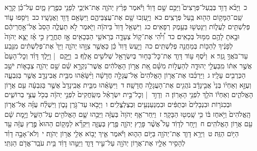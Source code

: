 \documentclass[18pt]{article}
\newcommand{\kri}[1]{\Afootnote{#1}}	%
\begin{document}
 {\loc כ~}וַיָּבֹ֨א דָוִ֥ד בְּבַֽעַל־פְּרָצִים֮ וַיַּכֵּ֣ם שָׁ֣ם דָּוִד֒ וַיֹּ֕אמֶר פָּרַ֨ץ יְהֹוָ֧ה אֶת־אֹיְבַ֛י לְפָנַ֖י כְּפֶ֣רֶץ מָ֑יִם עַל־כֵּ֗ן קָרָ֛א שֵֽׁם־הַמָּק֥וֹם הַה֖וּא בַּ֥עַל פְּרָצִֽים׃ \startlock
 {\loc כא~}וַיַּ֥עַזְבוּ שָׁ֖ם אֶת־עֲצַבֵּיהֶ֑ם וַיִּשָּׂאֵ֥ם דָּוִ֖ד וַאֲנָשָֽׁיו׃ \startlock
 {\loc כב~}וַיֹּסִ֥פוּ ע֛וֹד פְּלִשְׁתִּ֖ים לַעֲל֑וֹת וַיִּנָּטְשׁ֖וּ בְּעֵ֥מֶק רְפָאִֽים׃ \startlock
 {\loc כג~}וַיִּשְׁאַ֤ל דָּוִד֙ בַּיהֹוָ֔ה וַיֹּ֖אמֶר לֹ֣א תַעֲלֶ֑ה הָסֵב֙ אֶל־אַ֣חֲרֵיהֶ֔ם וּבָ֥אתָ לָהֶ֖ם מִמּ֥וּל בְּכָאִֽים׃ \startlock
 {\loc כד~}וִ֠יהִ֠י  \edtext{(בשמעך)}{\kri{קרי: כְּֽשׇׁמְעֲךָ֞}}  אֶת־ק֧וֹל צְעָדָ֛ה בְּרָאשֵׁ֥י הַבְּכָאִ֖ים אָ֣ז תֶּחֱרָ֑ץ כִּ֣י אָ֗ז יָצָ֤א יְהֹוָה֙ לְפָנֶ֔יךָ לְהַכּ֖וֹת בְּמַחֲנֵ֥ה פְלִשְׁתִּֽים׃ \startlock
 {\loc כה~}וַיַּ֤עַשׂ דָּוִד֙ כֵּ֔ן כַּאֲשֶׁ֥ר צִוָּ֖הוּ יְהֹוָ֑ה וַיַּךְ֙ אֶת־פְּלִשְׁתִּ֔ים מִגֶּ֖בַע עַד־בֹּאֲךָ֥ גָֽזֶר׃ 
\startlock
 {\loc א~}וַיֹּ֨סֶף ע֥וֹד דָּוִ֛ד אֶת־כׇּל־בָּח֥וּר בְּיִשְׂרָאֵ֖ל שְׁלֹשִׁ֥ים אָֽלֶף׃ \startlock
 {\loc ב~}וַיָּ֣קׇם  |  וַיֵּ֣לֶךְ דָּוִ֗ד וְכׇל־הָעָם֙ אֲשֶׁ֣ר אִתּ֔וֹ מִֽבַּעֲלֵ֖י יְהוּדָ֑ה לְהַעֲל֣וֹת מִשָּׁ֗ם אֵ֚ת אֲר֣וֹן הָאֱלֹהִ֔ים אֲשֶׁר־נִקְרָ֣א שֵׁ֗ם שֵׁ֣ם יְהֹוָ֧ה צְבָא֛וֹת יֹשֵׁ֥ב הַכְּרֻבִ֖ים עָלָֽיו׃ \startlock
 {\loc ג~}וַיַּרְכִּ֜בוּ אֶת־אֲר֤וֹן הָאֱלֹהִים֙ אֶל־עֲגָלָ֣ה חֲדָשָׁ֔ה וַיִּ֨שָּׂאֻ֔הוּ מִבֵּ֥ית אֲבִינָדָ֖ב אֲשֶׁ֣ר בַּגִּבְעָ֑ה וְעֻזָּ֣א וְאַחְי֗וֹ בְּנֵי֙ אֲבִ֣ינָדָ֔ב נֹהֲגִ֖ים אֶת־הָעֲגָלָ֥ה חֲדָשָֽׁה׃ \startlock
 {\loc ד~}וַיִּשָּׂאֻ֗הוּ מִבֵּ֤ית אֲבִֽינָדָב֙ אֲשֶׁ֣ר בַּגִּבְעָ֔ה עִ֖ם אֲר֣וֹן הָאֱלֹהִ֑ים וְאַחְי֕וֹ הֹלֵ֖ךְ לִפְנֵ֥י הָאָרֽוֹן׃ \startlock
 {\loc ה~}וְדָוִ֣ד  |  וְכׇל־בֵּ֣ית יִשְׂרָאֵ֗ל מְשַֽׂחֲקִים֙ לִפְנֵ֣י יְהֹוָ֔ה בְּכֹ֖ל עֲצֵ֣י בְרוֹשִׁ֑ים וּבְכִנֹּר֤וֹת וּבִנְבָלִים֙ וּבְתֻפִּ֔ים וּבִמְנַעַנְעִ֖ים וּֽבְצֶלְצֱלִֽים׃ \startlock
 {\loc ו~}וַיָּבֹ֖אוּ עַד־גֹּ֣רֶן נָכ֑וֹן וַיִּשְׁלַ֨ח עֻזָּ֜ה אֶל־אֲר֤וֹן הָֽאֱלֹהִים֙ וַיֹּ֣אחֶז בּ֔וֹ כִּ֥י שָֽׁמְט֖וּ הַבָּקָֽר׃ \startlock
 {\loc ז~}וַיִּֽחַר־אַ֤ף יְהֹוָה֙ בְּעֻזָּ֔ה וַיַּכֵּ֥הוּ שָׁ֛ם הָאֱלֹהִ֖ים עַל־הַשַּׁ֑ל וַיָּ֣מׇת שָׁ֔ם עִ֖ם אֲר֥וֹן הָאֱלֹהִֽים׃ \startlock
 {\loc ח~}וַיִּ֣חַר לְדָוִ֔ד עַל֩ אֲשֶׁ֨ר פָּרַ֧ץ יְהֹוָ֛ה פֶּ֖רֶץ בְּעֻזָּ֑ה וַיִּקְרָ֞א לַמָּק֤וֹם הַהוּא֙ פֶּ֣רֶץ עֻזָּ֔ה עַ֖ד הַיּ֥וֹם הַזֶּֽה׃ \startlock
 {\loc ט~}וַיִּרָ֥א דָוִ֛ד אֶת־יְהֹוָ֖ה בַּיּ֣וֹם הַה֑וּא וַיֹּ֕אמֶר אֵ֛יךְ יָב֥וֹא אֵלַ֖י אֲר֥וֹן יְהֹוָֽה׃ \startlock
 {\loc י~}וְלֹא־אָבָ֣ה דָוִ֗ד לְהָסִ֥יר אֵלָ֛יו אֶת־אֲר֥וֹן יְהֹוָ֖ה עַל־עִ֣יר דָּוִ֑ד וַיַּטֵּ֣הוּ דָוִ֔ד בֵּ֥ית עֹבֵֽד־אֱדֹ֖ם הַגִּתִּֽי׃ \startlock
\end{document}
